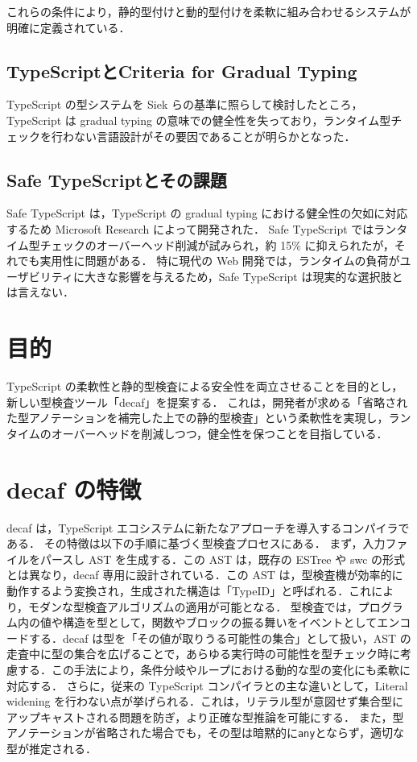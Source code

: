 \documentclass[11pt,twocolumn]{classes/yokou}
\begin{document}
これらの条件により，静的型付けと動的型付けを柔軟に組み合わせるシステムが明確に定義されている．

\subsection{TypeScriptとCriteria for Gradual Typing}

TypeScript の型システムを Siek らの基準に照らして検討したところ，TypeScript は gradual typing の意味での健全性を失っており，ランタイム型チェックを行わない言語設計がその要因であることが明らかとなった．

\subsection{Safe TypeScriptとその課題}

Safe TypeScript は，TypeScript の gradual typing における健全性の欠如に対応するため Microsoft Research によって開発された．
Safe TypeScript ではランタイム型チェックのオーバーヘッド削減が試みられ，約 15\% に抑えられたが，それでも実用性に問題がある．
特に現代の Web 開発では，ランタイムの負荷がユーザビリティに大きな影響を与えるため，Safe TypeScript は現実的な選択肢とは言えない．

\section{目的}

TypeScript の柔軟性と静的型検査による安全性を両立させることを目的とし，新しい型検査ツール「decaf」を提案する．
これは，開発者が求める「省略された型アノテーションを補完した上での静的型検査」という柔軟性を実現し，ランタイムのオーバーヘッドを削減しつつ，健全性を保つことを目指している．

\section{decaf の特徴}

decaf は，TypeScript エコシステムに新たなアプローチを導入するコンパイラである．
その特徴は以下の手順に基づく型検査プロセスにある．
まず，入力ファイルをパースし AST を生成する．この AST は，既存の ESTree や swc の形式とは異なり，decaf 専用に設計されている．この AST は，型検査機が効率的に動作するよう変換され，生成された構造は「TypeID」と呼ばれる．これにより，モダンな型検査アルゴリズムの適用が可能となる．
型検査では，プログラム内の値や構造を型として，関数やブロックの振る舞いをイベントとしてエンコードする．decaf は型を「その値が取りうる可能性の集合」として扱い，AST の走査中に型の集合を広げることで，あらゆる実行時の可能性を型チェック時に考慮する．この手法により，条件分岐やループにおける動的な型の変化にも柔軟に対応する．
さらに，従来の TypeScript コンパイラとの主な違いとして，Literal widening を行わない点が挙げられる．これは，リテラル型が意図せず集合型にアップキャストされる問題を防ぎ，より正確な型推論を可能にする．
また，型アノテーションが省略された場合でも，その型は暗黙的に\texttt{any}とならず，適切な型が推定される．
\end{document}
